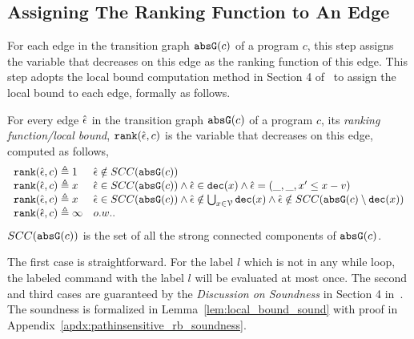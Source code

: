   \subsection{Assigning The Ranking Function to An Edge}
  For each edge in the transition graph $\mathtt{abs}{\mathtt{G}}(c)$ of a program $c$,
  this step assigns the variable that decreases on this edge as the ranking function of this edge.
  This step adopts the local bound computation method in Section 4 of~\cite{sinn2017complexity} to assign the local bound to each edge,
  formally as follows.
  \begin{defn}
  \label{def:ranking_gen}
  For every edge $\hat{\mathtt{\epsilon}{}}$ in the transition graph $\mathtt{abs}{\mathtt{G}}(c)$ of a program $c$,
  its \emph{ranking function/local bound}, $\mathtt{rank}(\hat{\mathtt{\epsilon}{}}, c)$
  is the variable that decreases on this edge, computed as follows,
  \[ 
  \begin{array}{ll}
    \mathtt{rank}(\hat{\mathtt{\epsilon}{}}, c) \triangleq 1 
    & \hat{\mathtt{\epsilon}{}} \notin SCC(\mathtt{abs}{\mathtt{G}}(c))
    \\
    \mathtt{rank}(\hat{\mathtt{\epsilon}{}}, c) \triangleq x
    & \hat{\mathtt{\epsilon}{}} \in SCC(\mathtt{abs}{\mathtt{G}}(c)) \land \hat{\mathtt{\epsilon}{}} \in \mathtt{dec}(x) \land  \hat{\mathtt{\epsilon}{}} = (\_, \_ , x' \leq x - v) \\
    \mathtt{rank}(\hat{\mathtt{\epsilon}{}}, c) \triangleq x
    & \hat{\mathtt{\epsilon}{}} \in SCC(\mathtt{abs}{\mathtt{G}}(c)) \land 
    \hat{\mathtt{\epsilon}{}}  \notin \bigcup_{x \in \mathcal{V}} \mathtt{dec}(x)
    \land \hat{\mathtt{\epsilon}{}} \notin SCC(\mathtt{abs}{\mathtt{G}}(c) \setminus \mathtt{dec}(x))\\
    \mathtt{rank}(\hat{\mathtt{\epsilon}{}}, c) \triangleq \infty
    & o.w..
  \end{array}
  \]
  $SCC(\mathtt{abs}{\mathtt{G}}(c))$ is the set of all the strong connected components of $\mathtt{abs}{\mathtt{G}}(c)$.
  \end{defn}
    The first case is straightforward. 
    For the label $l$ which is not in any while loop, 
    the labeled command with the label $l$ will be 
    evaluated at most once. 
    The second and third cases are guaranteed by the \emph{Discussion on Soundness} in Section 4 in~\cite{sinn2017complexity}.
    The soundness is formalized in Lemma~\ref{lem:local_bound_sound} with proof in Appendix~\ref{apdx:pathinsensitive_rb_soundness}.
